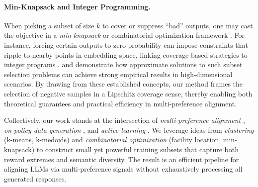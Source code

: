 \paragraph{Min-Knapsack and Integer Programming.}
When picking a subset of size $k$ to cover or suppress “bad” outputs, one may cast the objective in a \emph{min-knapsack} or combinatorial optimization framework \citep{kellerer2004introduction}. For instance, forcing certain outputs to zero probability can impose constraints that ripple to nearby points in embedding space, linking coverage-based strategies to integer programs \citep{chen2020big}. \citet{cohen2022improved} and \citet{har2004coresets} demonstrate how approximate solutions to such subset selection problems can achieve strong empirical results in high-dimensional scenarios. By drawing from these established concepts, our method frames the selection of negative samples in a Lipschitz coverage sense, thereby enabling both theoretical guarantees and practical efficiency in multi-preference alignment.


Collectively, our work stands at the intersection of \emph{multi-preference alignment} \citep{gupta2024swepo, cui2023ultrafeedback}, \emph{on-policy data generation} \citep{silver2017mastering, ouyang2022training}, and \emph{active learning} \citep{cohn1996active, settles2009active}. We leverage ideas from \emph{clustering} (k-means, k-medoids) and \emph{combinatorial optimization} (facility location, min-knapsack) \citep{kellerer2004multidimensional, cacchiani2022knapsack} to construct small yet powerful training subsets that capture both reward extremes and semantic diversity. The result is an efficient pipeline for aligning LLMs via multi-preference signals without exhaustively processing all generated responses.
